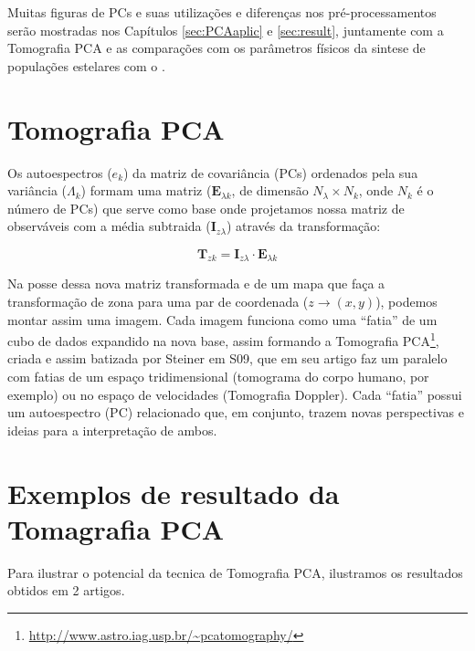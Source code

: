 Muitas figuras de PCs e suas utilizações e diferenças nos pré-processamentos serão mostradas nos Capítulos
\ref{sec:PCAaplic} e \ref{sec:result}, juntamente com a Tomografia PCA e as comparações com os parâmetros físicos da
sintese de populações estelares com o \starlight.


\section{Tomografia PCA}
\label{sec:PCAeTomoPCA:TomoPCA}

Os autoespectros ($e_k$) da matriz de covariância (PCs) ordenados pela sua variância ($\Lambda_k$) formam uma matriz
($\mathbf{E}{}_{\lambda k}$, de dimensão $N_\lambda \times N_k$, onde $N_k$ é o número de PCs) que serve como base onde
projetamos nossa matriz de observáveis com a média subtraida ($\mathbf{I}{}_{z \lambda}$) através da transformação:

\begin{equation}
	\label{eq:TomoPCA:tomogram2D}
	\mathbf{T}{}_{z k} = \mathbf{I}{}_{z \lambda} \cdot \mathbf{E}{}_{\lambda k}
\end{equation}

Na posse dessa nova matriz transformada e de um mapa que faça a transformação de zona para uma par de coordenada ($z \to
(x, y)$), podemos montar assim uma imagem. Cada imagem funciona como uma ``fatia'' de um cubo de dados expandido na nova
base, assim formando a Tomografia PCA\footnote{\url{http://www.astro.iag.usp.br/~pcatomography/}}, criada e assim
batizada por Steiner em S09, que em seu artigo faz um paralelo com fatias de um espaço tridimensional (tomograma do
corpo humano, por exemplo) ou no espaço de velocidades (Tomografia Doppler). Cada ``fatia'' possui um autoespectro (PC)
relacionado que, em conjunto, trazem novas perspectivas e ideias para a interpretação de ambos.

\section{Exemplos de resultado da Tomagrafia PCA}

Para ilustrar o potencial da tecnica de Tomografia PCA, ilustramos os resultados obtidos em 2 artigos.

